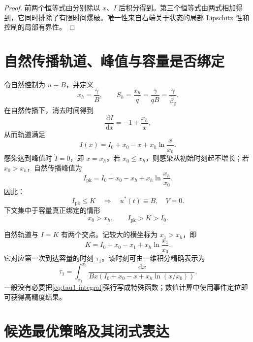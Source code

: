 \documentclass[11pt,a4paper,UTF8]{ctexart}
\theoremstyle{definition}
\newcommand{\dd}{\,\mathrm{d}}
\begin{document}
\begin{proof}
前两个恒等式由分别除以 $x$、$I$ 后积分得到。第三个恒等式由两式相加得到，它同时排除了有限时间爆破。唯一性来自右端关于状态的局部 Lipschitz 性和控制的局部有界性。
\end{proof}

\section{自然传播轨道、峰值与容量是否绑定}

令自然控制为 $u\equiv B$，并定义
\begin{equation}
x_h=\frac{\gamma}{B},\qquad
S_h=\frac{x_h}{q}=\frac{\gamma}{qB}=\frac{\gamma}{\bar\beta_2}.
\label{eq:herd-thresholds}
\end{equation}
在自然传播下，消去时间得到
\begin{equation}
\frac{\dd I}{\dd x}=-1+\frac{x_h}{x},
\end{equation}
从而轨道满足
\begin{equation}
I(x)=I_0+x_0-x+x_h\ln\frac{x}{x_0}.
\label{eq:lf-orbit}
\end{equation}
感染达到峰值时 $\dot I=0$，即 $x=x_h$。若 $x_0\le x_h$，则感染从初始时刻起不增长；若 $x_0>x_h$，自然传播峰值为
\begin{equation}
I_{\mathrm{pk}}
=I_0+x_0-x_h+x_h\ln\frac{x_h}{x_0}.
\label{eq:peak}
\end{equation}
因此：
\begin{equation}
I_{\mathrm{pk}}\le K
\quad\Longrightarrow\quad
u^*(t)\equiv B,\quad V=0.
\label{eq:inactive-case}
\end{equation}
下文集中于容量真正绑定的情形
\begin{equation}
x_0>x_h,\qquad I_{\mathrm{pk}}>K>I_0.
\label{eq:active-assumption}
\end{equation}

自然轨道与 $I=K$ 有两个交点。记较大的横坐标为 $x_1>x_h$，即
\begin{equation}
K=I_0+x_0-x_1+x_h\ln\frac{x_1}{x_0}.
\label{eq:x1-root}
\end{equation}
它对应第一次到达容量的时刻 $\tau_1$。该时刻可由一维积分精确表示为
\begin{equation}
\tau_1=
\int_{x_1}^{x_0}
\frac{\dd x}{B x\left(I_0+x_0-x+x_h\ln(x/x_0)\right)}.
\label{eq:tau1-integral}
\end{equation}
一般没有必要把\eqref{eq:tau1-integral}强行写成特殊函数；数值计算中使用事件定位即可获得高精度结果。

\section{候选最优策略及其闭式表达}
\end{document}
